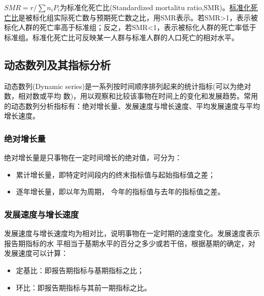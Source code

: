 \documentclass[
]{article}
\providecommand{\tightlist}{%
  \setlength{\itemsep}{0pt}\setlength{\parskip}{0pt}}
\begin{document}
\(SMR=r/\sum n_iP_i\)为标准化死亡比(Standardized mortalitu ratio,SMR)。\href{https://baike.baidu.com/item/\%E6\%A0\%87\%E5\%87\%86\%E5\%8C\%96\%E6\%AD\%BB\%E4\%BA\%A1\%E6\%AF\%94}{标准化死亡比}是被标化组实际死亡数与预期死亡数之比，用SMR表示。若SMR\textgreater1，表示被标化人群的死亡率高于标准组；反之，若SMR\textless1，表示被标化人群的死亡率低于标准组。标准化死亡比可反映某一人群与标准人群的人口死亡的相对水平。

\hypertarget{ux52a8ux6001ux6570ux5217ux53caux5176ux6307ux6807ux5206ux6790}{%
\subsection{动态数列及其指标分析}\label{ux52a8ux6001ux6570ux5217ux53caux5176ux6307ux6807ux5206ux6790}}

动态数列(Dynamic series)是一系列按时间顺序排列起来的统计指标(可以为绝对数，相对数或平均 数)，用以观察和比较该事物在时间上的变化和发展趋势。常用的动态数列分析指标有：绝对增长量、发展速度与增长速度、平均发展速度与平均增长速度。

\hypertarget{ux7eddux5bf9ux589eux957fux91cf}{%
\subsubsection{绝对增长量}\label{ux7eddux5bf9ux589eux957fux91cf}}

绝对增长量是只事物在一定时间增长的绝对值，可分为：

\begin{itemize}
\tightlist
\item
  累计增长量，即特定时间段内的终末指标值与起始指标值之差；
\item
  逐年增长量，即以年为周期， 今年的指标值与去年的指标值之差。
\end{itemize}

\hypertarget{ux53d1ux5c55ux901fux5ea6ux4e0eux589eux957fux901fux5ea6}{%
\subsubsection{发展速度与增长速度}\label{ux53d1ux5c55ux901fux5ea6ux4e0eux589eux957fux901fux5ea6}}

发展速度与增长速度均为相对比，说明事物在一定时期的速度变化。发展速度表示报告期指标的水 平相当于基期水平的百分之多少或若干倍，根据基期的确定，对发展速度可以计算：

\begin{itemize}
\tightlist
\item
  定基比：即报告期指标与基期指标之比；
\item
  环比：即报告期指标与其前一期指标之比。
\end{itemize}
\end{document}
